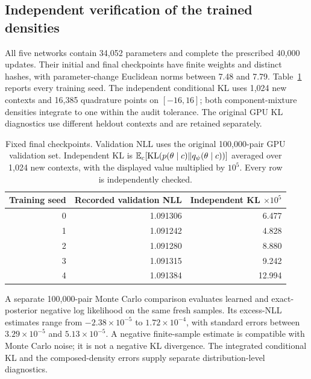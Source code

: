 \subsection{Independent verification of the trained densities}
All five networks contain 34,052 parameters and complete the prescribed 40,000 updates. Their initial and final checkpoints have finite weights and distinct hashes, with parameter-change Euclidean norms between 7.48 and 7.79. Table~\ref{tab:training-verification} reports every training seed. The independent conditional KL uses 1,024 new contexts and 16,385 quadrature points on $[-16,16]$; both component-mixture densities integrate to one within the audit tolerance. The original GPU KL diagnostics use different heldout contexts and are retained separately.

\begin{table}[ht]
 \centering
 \caption{Fixed final checkpoints. Validation NLL uses the original 100,000-pair GPU validation set. Independent KL is $\mathbb E_c[\operatorname{KL}(p(\theta\mid c)\|q_\psi(\theta\mid c))]$ averaged over 1,024 new contexts, with the displayed value multiplied by $10^5$. Every row is independently checked.}
 \label{tab:training-verification}
 \begin{tabular}{rrr}
 \toprule
 Training seed & Recorded validation NLL & Independent KL $\times10^5$\\
 \midrule
 0 & 1.091306 & 6.477\\
 1 & 1.091242 & 4.828\\
 2 & 1.091280 & 8.880\\
 3 & 1.091315 & 9.242\\
 4 & 1.091384 & 12.994\\
 \bottomrule
 \end{tabular}
\end{table}

A separate 100,000-pair Monte Carlo comparison evaluates learned and exact-posterior negative log likelihood on the same fresh samples. Its excess-NLL estimates range from $-2.38\times10^{-5}$ to $1.72\times10^{-4}$, with standard errors between $3.29\times10^{-5}$ and $5.13\times10^{-5}$. A negative finite-sample estimate is compatible with Monte Carlo noise; it is not a negative KL divergence. The integrated conditional KL and the composed-density errors supply separate distribution-level diagnostics.

